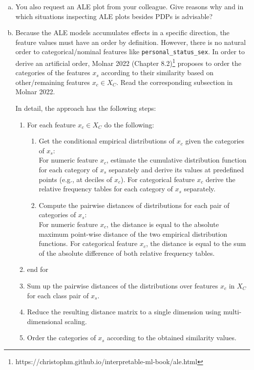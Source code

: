 {\begin{enumerate}[a)]
\item You also request an ALE plot from your colleague. 
Give reasons why and in which situations inspecting ALE plots besides PDPs is advisable?

\item 
Because the ALE models accumulates effects in a specific direction, the feature values must have an order by definition. However, there is no natural order to categorical/nominal features like \texttt{personal\_status\_sex}. 
In order to derive an artificial order, Molnar 2022 (Chapter 8.2)\footnote{https://christophm.github.io/interpretable-ml-book/ale.html} proposes to order the categories of the features $x_s$ according to their similarity based on other/remaining features $x_c \in X_C$. 
Read the corresponding subsection in Molnar 2022.

In detail, the approach has the following steps: 

\begin{enumerate}[1)]
  \item For each feature $x_c \in X_C$ do the following: 
  \begin{enumerate}
    \item Get the conditional empirical distributions of $x_c$ given the categories of $x_s$: \\
     For numeric feature $x_c$, estimate the cumulative distribution function for each category of $x_s$ separately and derive its values at predefined points (e.g., at deciles of $x_c$). 
     For categorical feature $x_c$ derive the relative frequency tables for each category of $x_s$ separately.
    \item Compute the pairwise distances of distributions for each pair of categories of $x_s$:\\ 
    For numeric feature $x_c$, the distance is equal to the absolute maximum point-wise distance of the two empirical distribution functions. For categorical feature $x_c$, the distance is equal to the sum of the absolute difference of both relative frequency tables.   
  \end{enumerate}
  \item end for
  \item Sum up the pairwise distances of the distributions over features $x_c$ in $X_C$ for each class pair of $x_s$. 
  \item Reduce the resulting distance matrix to a single dimension using multi-dimensional scaling.
  \item Order the categories of $x_s$ according to the obtained similarity values.
\end{enumerate}


\end{enumerate}}
